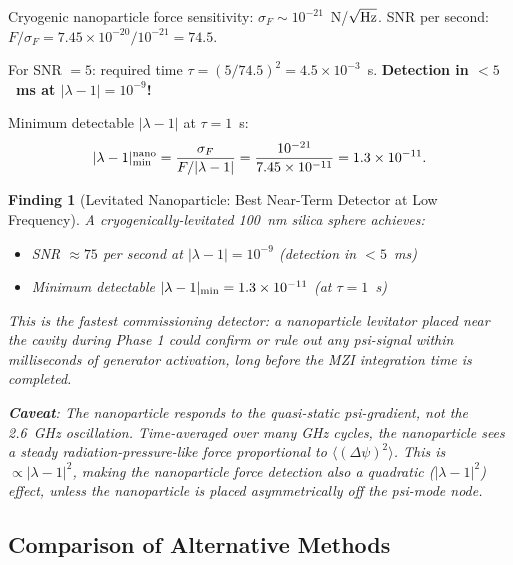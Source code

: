 \documentclass[11pt]{article}
\newtheorem{finding}{Finding}
\newcommand{\ee}[1]{\times 10^{#1}}
\begin{document}
Cryogenic nanoparticle force sensitivity: $\sigma_F \sim 10^{-21}$~N/$\sqrt{\rm Hz}$.
SNR per second: $F/\sigma_F = 7.45\ee{-20}/10^{-21} = 74.5$.

For SNR $= 5$: required time $\tau = (5/74.5)^2 = 4.5\ee{-3}$~s.
\textbf{Detection in $< 5$~ms at $|\lambda-1| = 10^{-9}$!}

Minimum detectable $|\lambda-1|$ at $\tau = 1$~s:
\begin{equation}
|\lambda-1|_{\rm min}^{\rm nano} = \frac{\sigma_F}{F/|\lambda-1|}
= \frac{10^{-21}}{7.45\ee{-11}} = 1.3\ee{-11}.
\end{equation}

\begin{finding}[Levitated Nanoparticle: Best Near-Term Detector at Low Frequency]
\label{find:a15-nano}
A cryogenically-levitated 100~nm silica sphere achieves:
\begin{itemize}
\item SNR $\approx 75$ per second at $|\lambda-1| = 10^{-9}$ (detection in $< 5$~ms)
\item Minimum detectable $|\lambda-1|_{\rm min} = 1.3\ee{-11}$ (at $\tau = 1$~s)
\end{itemize}
This is the fastest commissioning detector: a nanoparticle levitator placed
near the cavity during Phase 1 could confirm or rule out any psi-signal within
milliseconds of generator activation, long before the MZI integration time is completed.

\textbf{Caveat}: The nanoparticle responds to the quasi-static psi-gradient,
not the 2.6~GHz oscillation. Time-averaged over many GHz cycles, the
nanoparticle sees a steady radiation-pressure-like force proportional to
$\langle(\Delta\psi)^2\rangle$. This is $\propto |\lambda-1|^2$, making the
nanoparticle force detection also a quadratic ($|\lambda-1|^2$) effect, unless
the nanoparticle is placed asymmetrically off the psi-mode node.
\end{finding}

\subsection{Comparison of Alternative Methods}
\end{document}

